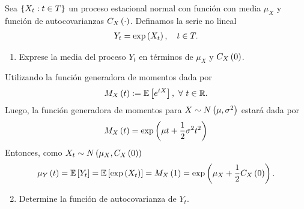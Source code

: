\documentclass[../main.tex]{subfiles}
\begin{document}
    \begin{enunciado}
        Sea $\left\lbrace X_t : t \in T \right\rbrace$ un proceso estacional normal con función con media $\mu_X$ y función de autocovarianzas $C_X\left( \cdot \right)$. Definamos la serie no lineal
            \begin{align}
                \label{2:modelo}
                Y_t = \exp\left( X_t \right),\quad t \in T.
            \end{align}
        \begin{enumerate}
        	\item Exprese la media del proceso $Y_t$ en términos de $\mu_X$ y $C_X\left( 0 \right)$.
        \end{enumerate}
    \end{enunciado}
    \begin{demostracion}
        Utilizando la función generadora de momentos dada por
            \begin{align*}
                M_X\left( t \right) := \mathbb{E} \left[ e^{tX} \right],\ \forall\  t \in \mathbb{R}.
            \end{align*}
        Luego, la función generadora de momentos para $X \sim N\left( \mu,\sigma^2 \right)$ estará dada por
            \begin{align*}
                M_X\left( t \right) = \exp\left( \mu t + \frac 1 2 \sigma^2 t^2 \right)
            \end{align*}
        Entonces, como $X_t \sim N\left( \mu_X, C_X\left( 0 \right) \right)$
            \begin{align*}
                \mu_Y\left( t \right) = \mathbb{E} \left[ Y_t \right] = \mathbb{E} \left[ \exp\left( X_t \right) \right] = M_X\left( 1 \right) = \exp\left( {\mu_X} + \frac 1 2 C_X\left( 0 \right) \right).
            \end{align*}
    \end{demostracion}
    \vspace{1em}
    \begin{enunciado}
    	\begin{enumerate}
    		\setcounter{enumi}{1}
        	\item Determine la función de autocovarianza de $Y_t$.
    	\end{enumerate}
    \end{enunciado}
\end{document}
